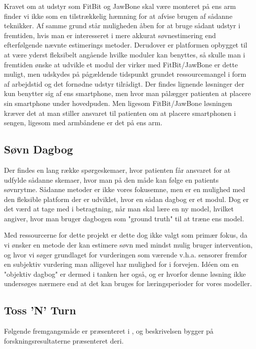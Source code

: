 Kravet om at udstyr som FitBit og JawBone skal være monteret på ens arm finder vi ikke som en tilstrækkelig hæmning for at afvise brugen af sådanne teknikker.
Af samme grund står muligheden åben for at bruge sådant udstyr i fremtiden, hvis man er interesseret i mere akkurat søvnestimering end efterfølgende nævnte estimerings metoder.
Derudover er platformen opbygget til at være yderst fleksibelt angående hvilke moduler kan benyttes, så skulle man i fremtiden ønske at udvikle et modul der virker med FitBit/JawBone er dette muligt, men udskydes på pågældende tidspunkt grundet ressourcemangel i form af arbejdstid og det fornødne udstyr tilrådigt.
Der findes lignende løsninger der kun benytter sig af ens smartphone, men hvor man pålægger patienten at placere sin smartphone under hovedpuden.
Men ligesom FitBit/JawBone løsningen kræver det at man stiller ansvaret til patienten om at placere smartphonen i sengen, ligesom med armbåndene er det på ens arm.

\subsection{Søvn Dagbog}
Der findes en lang række spørgeskemaer, hvor patienten får ansvaret for at udfylde sådanne skemaer, hvor man på den måde kan følge en patients søvnrytme.
Sådanne metoder er ikke vores fokusemne, men er en mulighed med den fleksible platform der er udviklet, hvor en sådan dagbog er et modul.
Dog er det værd at tage med i betragtning, når man skal lære en ny model, hvilket \cite{Min:2014:TNT:2556288.2557220} angiver,
hvor man bruger dagbogen som "ground truth" til at træne ens model.

Med ressourcerne for dette projekt er dette dog ikke valgt som primær fokus, da vi ønsker en metode der kan estimere søvn med mindst mulig bruger intervention, og hvor vi søger grundlaget for vurderingen som værende v.h.a. sensorer fremfor en subjektiv vurdering man alligevel har mulighed for i forvejen.
Idéen om en "objektiv dagbog" er dermed i tanken her også, og er hvorfor denne løsning ikke undersøges nærmere end at det kan bruges for læringsperioder for vores modeller.

\subsection{Toss 'N' Turn}
Følgende fremgangsmåde er præsenteret i \cite{Min:2014:TNT:2556288.2557220}, og beskrivelsen bygger på forskningsresultaterne præsenteret deri.

